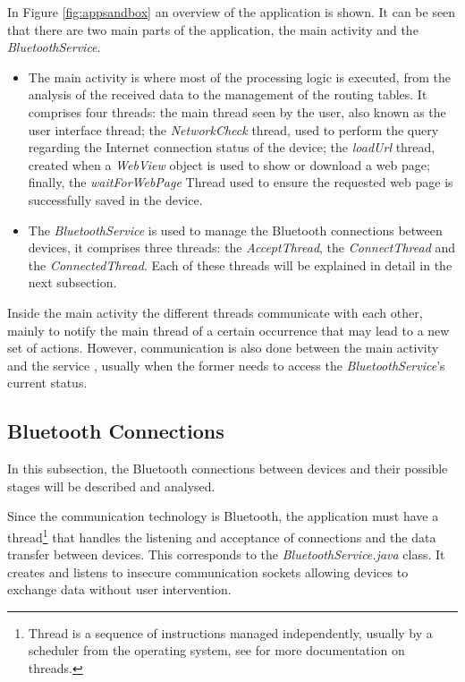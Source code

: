 In Figure \ref{fig:appsandbox} an overview of the application is shown. It can be seen that there are two main parts of the application, the main activity and the \textit{BluetoothService}.
\begin{itemize}

\item The main activity is where most of the processing logic is executed, from the analysis of the received data to the management of the routing tables. It comprises four threads: the main thread seen by the user, also known as the user interface thread; the \textit{NetworkCheck} thread, used to perform the query regarding the Internet connection status of the device; the \textit{loadUrl} thread, created when a \textit{WebView} object is used to show or download a web page; finally, the \textit{waitForWebPage} Thread used to ensure the requested web page is successfully saved in the device.

\item The \textit{BluetoothService} is used to manage the Bluetooth connections between devices, it comprises three threads: the \textit{AcceptThread}, the \textit{ConnectThread} and the \textit{ConnectedThread}. Each of these threads will be explained in detail in the next subsection.

\end{itemize}

Inside the main activity the different threads communicate with each other, mainly to notify the main thread of a certain occurrence that may lead to a new set of actions. However, communication is also done between the main activity and the service , usually when the former needs to access the \textit{BluetoothService}'s current status.

\subsection{Bluetooth Connections}
\label{subsec:btconn}

In this subsection, the Bluetooth connections between devices and their possible stages will be described and analysed.

Since the communication technology is Bluetooth, the application must have a thread\footnote{Thread is a sequence of instructions managed independently, usually by a scheduler from the operating system, see \cite{threads} for more documentation on threads.} that handles the listening and acceptance of connections and the data transfer between devices. This corresponds to the \textit{BluetoothService.java} class. It creates and listens to insecure communication sockets allowing devices to exchange data without user intervention.

